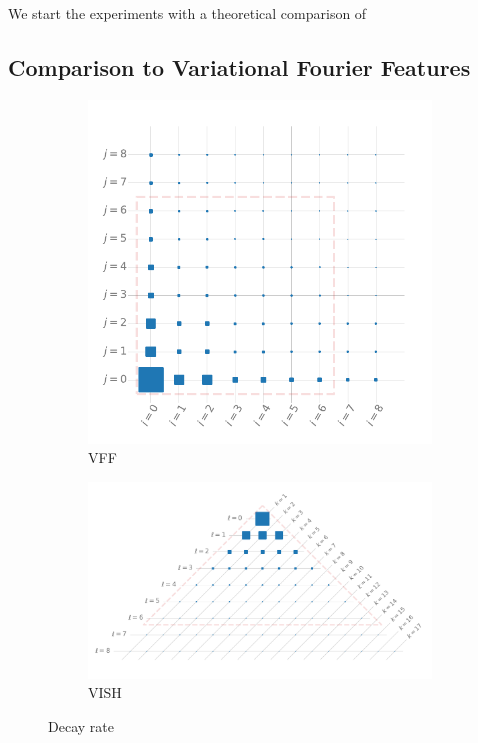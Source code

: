 We start the experiments with a theoretical comparison of 

\subsection{Comparison to Variational Fourier Features}

\begin{figure}[tbh!]
  \centering
\begin{subfigure}{0.36\textwidth}
  \includegraphics[width=\textwidth]{VFF_decay}
  \caption{VFF}
  \label{fig:decay-vff}
\end{subfigure}\hfil %
\begin{subfigure}{0.63\textwidth}
  \includegraphics[width=\textwidth]{VISH_decay}
  \caption{VISH}
  \label{fig:decay-vish}
\end{subfigure}\hfil %
\caption{Decay rate}
\label{fig:decay-vff-vs-vish}
\end{figure}


